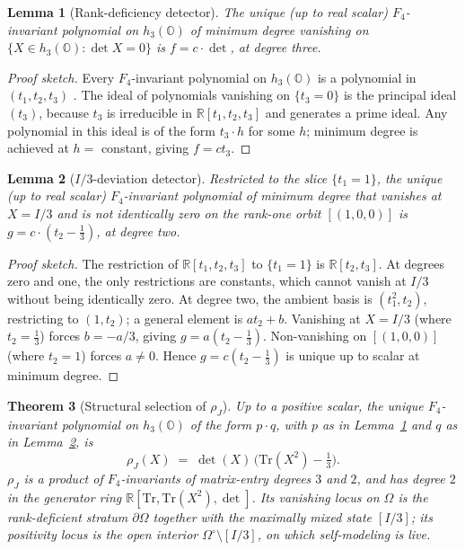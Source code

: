 \documentclass[12pt]{article}
\newtheorem{theorem}{Theorem}
\newtheorem{lemma}[theorem]{Lemma}
\theoremstyle{remark}
\newcommand{\hthree}{h_3(\mathbb{O})}
\newcommand{\Ffour}{F_4}
\newcommand{\rhoJ}{\rho_J}
\newcommand{\Tr}{\mathrm{Tr}}
\begin{document}
\begin{lemma}[Rank-deficiency detector]\label{lem:det-forced}
The unique (up to real scalar) $\Ffour$-invariant polynomial on $\hthree$
of minimum degree vanishing on $\{X \in \hthree : \det X = 0\}$ is
$f = c \cdot \det$, at degree three.
\end{lemma}

\begin{proof}[Proof sketch]
Every $\Ffour$-invariant polynomial on $\hthree$ is a polynomial in
$(t_1, t_2, t_3)$ \cite{faraut-koranyi1994}. The ideal of polynomials
vanishing on $\{t_3 = 0\}$ is the principal ideal $(t_3)$, because $t_3$
is irreducible in $\mathbb{R}[t_1, t_2, t_3]$ and generates a prime ideal.
Any polynomial in this ideal is of the form $t_3 \cdot h$ for some
$h$; minimum degree is achieved at $h = $ constant, giving $f = c t_3$.
\end{proof}

\begin{lemma}[$I/3$-deviation detector]\label{lem:t2-forced}
Restricted to the slice $\{t_1 = 1\}$, the unique (up to real scalar)
$\Ffour$-invariant polynomial of minimum degree that vanishes at $X = I/3$
and is not identically zero on the rank-one orbit $[(1, 0, 0)]$ is
$g = c \cdot (t_2 - \tfrac{1}{3})$, at degree two.
\end{lemma}

\begin{proof}[Proof sketch]
The restriction of $\mathbb{R}[t_1, t_2, t_3]$ to $\{t_1 = 1\}$ is
$\mathbb{R}[t_2, t_3]$. At degrees zero and one, the only restrictions are
constants, which cannot vanish at $I/3$ without being identically zero. At
degree two, the ambient basis is $(t_1^2, t_2)$, restricting to $(1, t_2)$;
a general element is $a t_2 + b$. Vanishing at $X = I/3$ (where
$t_2 = \tfrac{1}{3}$) forces $b = -a/3$, giving $g = a(t_2 - \tfrac{1}{3})$.
Non-vanishing on $[(1,0,0)]$ (where $t_2 = 1$) forces $a \neq 0$. Hence
$g = c (t_2 - \tfrac{1}{3})$ is unique up to scalar at minimum degree.
\end{proof}

\begin{theorem}[Structural selection of $\rhoJ$]\label{thm:rho-uniqueness}
Up to a positive scalar, the unique $\Ffour$-invariant polynomial on
$\hthree$ of the form $p \cdot q$, with $p$ as in
Lemma~\ref{lem:det-forced} and $q$ as in Lemma~\ref{lem:t2-forced}, is
\begin{equation}\label{eq:rho-J-definition}
  \rhoJ(X) \;=\; \det(X)\,\bigl(\Tr(X^2) - \tfrac{1}{3}\bigr).
\end{equation}
$\rhoJ$ is a product of $\Ffour$-invariants of matrix-entry degrees
$3$ and $2$, and has degree $2$ in the generator ring
$\mathbb{R}[\Tr, \Tr(X^2), \det]$. Its vanishing locus on $\Omega$ is
the rank-deficient stratum $\partial\Omega$ together with the
maximally mixed state $[I/3]$; its positivity locus is the open
interior $\Omega^{\circ} \setminus [I/3]$, on which self-modeling is
live.
\end{theorem}
\end{document}
